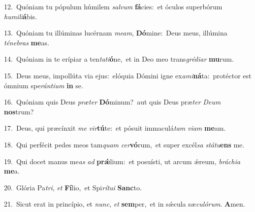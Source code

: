 {\numbfont\textcolor{\numbcolor}{12.}}~Quóniam tu pópulum húmilem \textit{sal}\-\textit{vum} \textbf{fá}\-cies:~\star et óculos superbórum \textit{hu}\-\textit{mi}\textit{li}\textbf{á}bis.\par
{\numbfont\textcolor{\numbcolor}{13.}}~Quóniam tu illúminas lucérnam \textit{me}\-\textit{am}, \textbf{Dó}\-mine:~\star Deus meus, illúmina \textit{té}\-\textit{ne}\textit{bras} \textbf{me}\-as.\par
{\numbfont\textcolor{\numbcolor}{14.}}~Quóniam in te erípiar a ten\-\textit{ta}\-\textit{ti}\textbf{ó}ne,~\star et in Deo meo trans\-\textit{gré}\-\textit{di}\textit{ar} \textbf{mu}\-rum.\par
{\numbfont\textcolor{\numbcolor}{15.}}~Deus meus, impollúta via ejus:~\dagger elóquia Dómini igne ex\-\textit{a}\-\textit{mi}\textbf{ná}ta:~\star protéctor est ómnium spe\-\textit{rán}\-\textit{ti}\textit{um} \textbf{in} se.\par
{\numbfont\textcolor{\numbcolor}{16.}}~Quóniam quis Deus \textit{præ}\-\textit{ter} \textbf{Dó}\-minum?~\star aut quis Deus præ\textit{ter} \textit{De}\-\textit{um} \textbf{nos}\-trum?\par
{\numbfont\textcolor{\numbcolor}{17.}}~Deus, qui præcínxit \textit{me} \textit{vir}\-\textbf{tú}te:~\star et pósuit immaculá\textit{tam} \textit{vi}\-\textit{am} \textbf{me}\-am.\par
{\numbfont\textcolor{\numbcolor}{18.}}~Qui perfécit pedes meos tam\textit{quam} \textit{cer}\-\textbf{vó}rum,~\star et super excél\textit{sa} \textit{stá}\-\textit{tu}\textbf{ens} me.\par
{\numbfont\textcolor{\numbcolor}{19.}}~Qui docet manus me\textit{as} \textit{ad} \textbf{prǽ}\-lium:~\star et posuísti, ut arcum ǽreum, \textit{brá}\-\textit{chi}\textit{a} \textbf{me}\-a.\par
{\numbfont\textcolor{\numbcolor}{20.}}~Glória Pa\-\textit{tri}\-, \textit{et} \textbf{Fí}\-lio,~\star et Spi\-\textit{rí}\-\textit{tu}\textit{i} \textbf{Sanc}\-to.\par
{\numbfont\textcolor{\numbcolor}{21.}}~Sicut erat in princípio, et \textit{nunc}\-, \textit{et} \textbf{sem}\-per,~\star et in sǽcula sæ\-\textit{cu}\-\textit{ló}\textit{rum}. \textbf{A}\-men.\par

